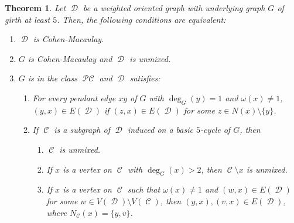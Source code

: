 \documentclass[12pt, amscd]{amsart}
\newtheorem{thm}{Theorem}[section]
\theoremstyle{definition}
\DeclareMathOperator{\pc}{\mathcal{PC}}
\DeclareMathOperator{\D}{\mathcal{D}}
\DeclareMathOperator{\C}{\mathcal{C}}
\newcommand{\0}{\bold{0}}
\begin{document}
\begin{thm}\label{main-theorem} Let $\D$ be a weighted oriented graph with underlying graph $G$ of girth at least $5$. Then, the following conditions are equivalent:
\begin{enumerate}
\item $\D$ is Cohen-Macaulay.
\item $G$ is Cohen-Macaulay and $\D$ is unmixed.
\item $G$ is in the class $\pc$ and $\D$ satisfies:
\begin{enumerate}
\item For every pendant edge $xy$ of $G$ with $\deg_G(y)=1$ and $\omega(x) \ne 1$, $(y,x)\in E(\D)$ if $(z,x)\in E(\D)$ for some $z\in N(x)\setminus \{y\}$.
\item If $\C$ is a subgraph of $\D$ induced on a basic $5$-cycle of $G$, then
\begin{enumerate}
\item $\C$ is unmixed.
\item If $x$ is a vertex on $\C$ with $\deg_G(x) > 2$, then $\C\setminus x$ is unmixed.
\item If $x$ is a vertex on $\C$ such that $\omega(x)\ne 1$ and $(w,x)\in E(\D)$ for some $w\in V(\D)\setminus V(\C)$, then $(y,x), (v,x)\in E(\D)$, where $N_{\C}(x)=\{y,v\}$.
\end{enumerate}
\end{enumerate}
\end{enumerate}
\end{thm}
\end{document}
